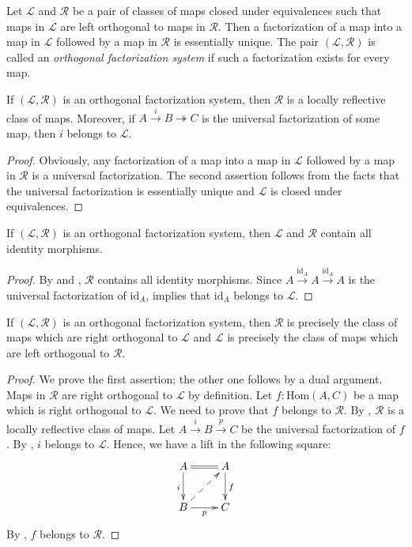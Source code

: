 \documentclass[reqno]{amsart}
\theoremstyle{definition}
\theoremstyle{remark}
\newcommand{\fs}[1]{\mathrm{#1}}
\newcommand{\Hom}{\fs{Hom}}
\newcommand{\id}{\fs{id}}
\numberwithin{figure}{section}
\begin{document}
Let $\mathcal{L}$ and $\mathcal{R}$ be a pair of classes of maps closed under equivalences such that maps in $\mathcal{L}$ are left orthogonal to maps in $\mathcal{R}$.
Then a factorization of a map into a map in $\mathcal{L}$ followed by a map in $\mathcal{R}$ is essentially unique.
The pair $(\mathcal{L},\mathcal{R})$ is called an \emph{orthogonal factorization system} if such a factorization exists for every map.

\begin{lem}
If $(\mathcal{L},\mathcal{R})$ is an orthogonal factorization system, then $\mathcal{R}$ is a locally reflective class of maps.
Moreover, if $A \xrightarrow{i} B \twoheadrightarrow C$ is the universal factorization of some map, then $i$ belongs to $\mathcal{L}$.
\end{lem}
\begin{proof}
Obviously, any factorization of a map into a map in $\mathcal{L}$ followed by a map in $\mathcal{R}$ is a universal factorization.
The second assertion follows from the facts that the universal factorization is essentially unique and $\mathcal{L}$ is closed under equivalences.
\end{proof}

\begin{prop}
If $(\mathcal{L},\mathcal{R})$ is an orthogonal factorization system, then $\mathcal{L}$ and $\mathcal{R}$ contain all identity morphisms.
\end{prop}
\begin{proof}
By  and , $\mathcal{R}$ contains all identity morphisms.
Since $A \xrightarrow{\id_A} A \xrightarrow{\id_A} A$ is the universal factorization of $\id_A$,  implies that $\id_A$ belongs to $\mathcal{L}$.
\end{proof}

\begin{prop}
If $(\mathcal{L},\mathcal{R})$ is an orthogonal factorization system, then
$\mathcal{R}$ is precisely the class of maps which are right orthogonal to $\mathcal{L}$ and
$\mathcal{L}$ is precisely the class of maps which are left orthogonal to $\mathcal{R}$.
\end{prop}
\begin{proof}
We prove the first assertion; the other one follows by a dual argument.
Maps in $\mathcal{R}$ are right orthogonal to $\mathcal{L}$ by definition.
Let $f : \Hom(A,C)$ be a map which is right orthogonal to $\mathcal{L}$.
We need to prove that $f$ belongs to $\mathcal{R}$.
By , $\mathcal{R}$ is a locally reflective class of maps.
Let $A \xrightarrow{i} B \xrightarrow{p} C$ be the universal factorization of $f$.
By , $i$ belongs to $\mathcal{L}$.
Hence, we have a lift in the following square:
\[ \xymatrix{ A \ar@{=}[r] \ar[d]_i     & A \ar[d]^f \\
              B \ar[r]_p \ar@{-->}[ur]  & C
            } \]
By , $f$ belongs to $\mathcal{R}$.
\end{proof}
\end{document}
